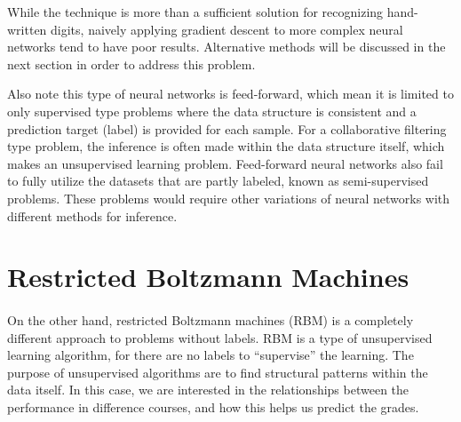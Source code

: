 
While the technique is more than a sufficient solution 
for recognizing hand-written digits,
naively applying gradient descent to more complex 
neural networks tend to have poor results.
Alternative methods will be discussed in the next section 
in order to address this problem.

Also note this type of neural networks is feed-forward, 
which mean it is limited to only supervised type problems
where the data structure is consistent 
and a prediction target (label) is provided for each sample.
For a collaborative filtering type problem,
the inference is often made within the data structure itself, 
which makes an unsupervised learning problem.
Feed-forward neural networks also fail to fully utilize 
the datasets that are partly labeled, 
known as semi-supervised problems.
These problems would require other variations of neural networks
with different methods for inference.

















\section{Restricted Boltzmann Machines} \label{sc:rbm}

\paragraph{}
On the other hand, restricted Boltzmann machines (RBM) is a
completely different approach to problems without labels.
RBM is a type of unsupervised learning algorithm, 
for there are no labels to ``supervise'' the learning.
The purpose of unsupervised algorithms are to find
structural patterns within the data itself.
In this case, we are interested in the relationships 
between the performance in difference courses,
and how this helps us predict the grades.

